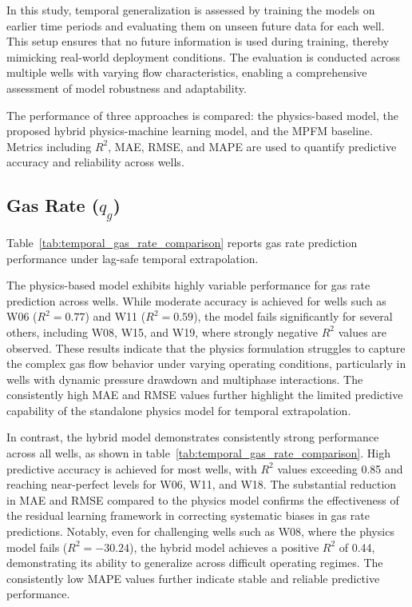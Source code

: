 \documentclass[12pt,APA]{uomthesis}
\begin{document}
In this study, temporal generalization is assessed by training the models on earlier time periods and evaluating them on unseen future data for each well. This setup ensures that no future information is used during training, thereby mimicking real-world deployment conditions. The evaluation is conducted across multiple wells with varying flow characteristics, enabling a comprehensive assessment of model robustness and adaptability.

The performance of three approaches is compared: the physics-based model, the proposed hybrid physics-machine learning model, and the MPFM baseline. Metrics including $R^2$, MAE, RMSE, and MAPE are used to quantify predictive accuracy and reliability across wells.


\subsection{Gas Rate (\texorpdfstring{$q_g$}{qg})}
Table~\ref{tab:temporal_gas_rate_comparison} reports gas rate prediction performance under lag-safe temporal extrapolation.

The physics-based model exhibits highly variable performance for gas rate prediction across wells. While moderate accuracy is achieved for wells such as W06 ($R^2 = 0.77$) and W11 ($R^2 = 0.59$), the model fails significantly for several others, including W08, W15, and W19, where strongly negative $R^2$ values are observed. These results indicate that the physics formulation struggles to capture the complex gas flow behavior under varying operating conditions, particularly in wells with dynamic pressure drawdown and multiphase interactions. The consistently high MAE and RMSE values further highlight the limited predictive capability of the standalone physics model for temporal extrapolation.

In contrast, the hybrid model demonstrates consistently strong performance across all wells, as shown in table~\ref{tab:temporal_gas_rate_comparison}. High predictive accuracy is achieved for most wells, with $R^2$ values exceeding 0.85 and reaching near-perfect levels for W06, W11, and W18. The substantial reduction in MAE and RMSE compared to the physics model confirms the effectiveness of the residual learning framework in correcting systematic biases in gas rate predictions. Notably, even for challenging wells such as W08, where the physics model fails ($R^2 = -30.24$), the hybrid model achieves a positive $R^2$ of 0.44, demonstrating its ability to generalize across difficult operating regimes. The consistently low MAPE values further indicate stable and reliable predictive performance.
\end{document}

